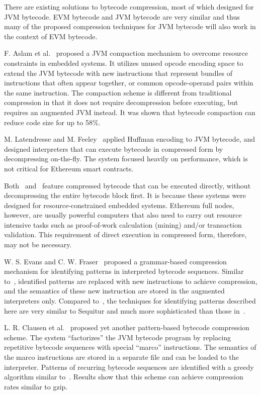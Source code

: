 There are existing solutions to bytecode compression, most of which designed for JVM bytecode.
EVM bytecode and JVM bytecode are very similar and thus many of the proposed compression techniques for JVM bytecode
will also work in the context of EVM bytecode.

F. Aslam et al.~\cite{aslam2010} proposed a JVM compaction mechanism to overcome resource constraints in embedded systems.
It utilizes unused opcode encoding space to extend the JVM bytecode with new instructions that represent bundles of
instructions that often appear together, or common opcode-operand pairs within the same instruction.
The compaction scheme is different from traditional compression in that it does not require decompression before executing,
but requires an augmented JVM instead. It was shown that bytecode compaction can reduce code size for up to 58\%.

M. Latendresse and M. Feeley~\cite{marc2003} applied Huffman encoding to JVM bytecode, and designed interpreters that
can execute bytecode in compressed form by decompressing on-the-fly.
The system focused heavily on performance, which is not critical for Ethereum smart contracts.

Both~\cite{aslam2010} and~\cite{marc2003} feature compressed bytecode that can be executed directly, without decompressing
the entire bytecode block first. It is because these systems were designed for resource-constrained embedded systems.
Ethereum full nodes, however, are usually powerful computers that also need to carry out resource intensive tasks such as
proof-of-work calculation (mining) and/or transaction validation. This requirement of direct execution in compressed form,
therefore, may not be necessary.

W. S. Evans and C. W. Fraser~\cite{evans2003} proposed a grammar-based compression mechanism for identifying patterns in
interpreted bytecode sequences.
Similar to~\cite{aslam2010}, identified patterns are replaced with new instructions to achieve compression, and the semantics
of these new instruction are stored in the augmented interpreters only. Compared to~\cite{aslam2010}, the techniques for
identifying patterns described here are very similar to Sequitur and much more sophisticated than those in~\cite{aslam2010}.

L. R. Clausen et al.~\cite{clausen2000} proposed yet another pattern-based bytecode compression scheme. The system ``factorizes''
the JVM bytecode program by replacing repetitive bytecode sequences with special ``marco'' instructions. The semantics of the
marco instructions are stored in a separate file and can be loaded to the interpreter. Patterns of recurring bytecode sequences
are identified with a greedy algorithm similar to~\cite{aslam2010}. Results show that this scheme can achieve compression rates
similar to gzip.

